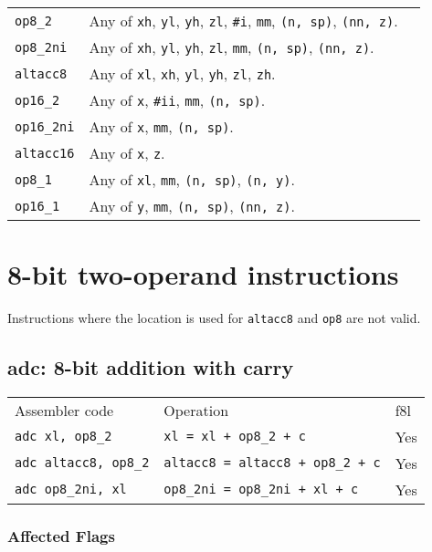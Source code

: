 \documentclass{book}
\begin{document}
\begin{tabular}{l l l}
\texttt{op8\_2} & Any of \texttt{xh}, \texttt{yl}, \texttt{yh}, \texttt{zl}, \texttt{\#i}, \texttt{mm}, \texttt{(n, sp)}, \texttt{(nn, z)}. \\
\texttt{op8\_2ni} & Any of \texttt{xh}, \texttt{yl}, \texttt{yh}, \texttt{zl}, \texttt{mm}, \texttt{(n, sp)}, \texttt{(nn, z)}. \\
\texttt{altacc8} & Any of \texttt{xl}, \texttt{xh}, \texttt{yl}, \texttt{yh}, \texttt{zl}, \texttt{zh}. \\
\texttt{op16\_2} & Any of \texttt{x}, \texttt{\#ii}, \texttt{mm}, \texttt{(n, sp)}. \\
\texttt{op16\_2ni} & Any of \texttt{x}, \texttt{mm}, \texttt{(n, sp)}. \\
\texttt{altacc16} & Any of \texttt{x}, \texttt{z}. \\
\texttt{op8\_1} & Any of \texttt{xl}, \texttt{mm}, \texttt{(n, sp)}, \texttt{(n, y)}. \\
\texttt{op16\_1} & Any of \texttt{y}, \texttt{mm}, \texttt{(n, sp)}, \texttt{(nn, z)}. \\
\end{tabular}

\section{8-bit two-operand instructions}

Instructions where the location is used for \texttt{altacc8} and \texttt{op8} are not valid.

\subsection{adc: 8-bit addition with carry}

\begin{tabular}{l l l}
Assembler code            & Operation                                  & f8l \\
\texttt{adc xl, op8\_2}      & \texttt{xl = xl + op8\_2 + c}           & Yes \\
\texttt{adc altacc8, op8\_2} & \texttt{altacc8 = altacc8 + op8\_2 + c} & Yes \\
\texttt{adc op8\_2ni, xl}    & \texttt{op8\_2ni = op8\_2ni + xl + c}   & Yes
\end{tabular}

\subsubsection*{Affected Flags}
\end{document}
